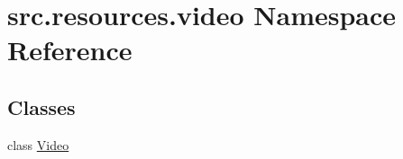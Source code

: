 \hypertarget{namespacesrc_1_1resources_1_1video}{\section{src.\+resources.\+video Namespace Reference}
\label{namespacesrc_1_1resources_1_1video}
}
\subsection*{Classes}
\begin{DoxyCompactItemize}
\item 
class \hyperlink{classsrc_1_1resources_1_1video_1_1_video}{Video}
\end{DoxyCompactItemize}
